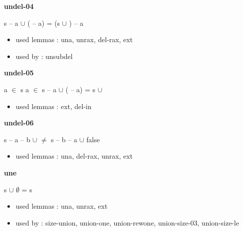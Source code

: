 \documentclass[a4paper]{article}
\begin{document}
\medskip

\bigskip

{\large\bf undel-04}

\medskip

 \Fol s -- a $\cup$ ( -- a) = (s $\cup$ ) -- a

\begin{itemize}


\item       used lemmas  : una, unrax, del-rax, ext
\item       used by      : unsubdel

\end{itemize}

\medskip

\bigskip

{\large\bf undel-05}

\medskip

 \Fol \Not a $\in$ s \And \Not a $\in$  \Imp s -- a $\cup$ ( -- a) = s $\cup$ 

\begin{itemize}


\item       used lemmas  : ext, del-in

\end{itemize}

\medskip

\bigskip

{\large\bf undel-06}

\medskip

 \Fol s -- a -- b $\cup$  $\neq$ s -- b -- a $\cup$  \Equiv false

\begin{itemize}


\item       used lemmas  : una, del-rax, unrax, ext

\end{itemize}

\medskip

\bigskip

{\large\bf une}

\medskip

 \Fol s $\cup$ $\emptyset$ = s

\begin{itemize}


\item       used lemmas  : una, unrax, ext
\item       used by      : size-union, union-one, union-rewone, union-size-03, union-size-le

\end{itemize}
\end{document}
